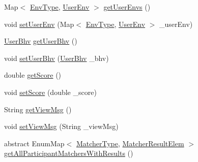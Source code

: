 \begin{DoxyCompactItemize}
\-Map$<$ \hyperlink{enumlab_1_1davidahn_1_1appshuttle_1_1collect_1_1env_1_1_env_type}{\-Env\-Type}, \hyperlink{classlab_1_1davidahn_1_1appshuttle_1_1collect_1_1env_1_1_user_env}{\-User\-Env} $>$ \hyperlink{classlab_1_1davidahn_1_1appshuttle_1_1predict_1_1matcher_1_1_matcher_result_elem_ad212c0c86a4040e391763f2ab1e55842}{get\-User\-Envs} ()
\item 
void \hyperlink{classlab_1_1davidahn_1_1appshuttle_1_1predict_1_1matcher_1_1_matcher_result_elem_af666120c1b741bb9b600a724f8a56019}{set\-User\-Env} (\-Map$<$ \hyperlink{enumlab_1_1davidahn_1_1appshuttle_1_1collect_1_1env_1_1_env_type}{\-Env\-Type}, \hyperlink{classlab_1_1davidahn_1_1appshuttle_1_1collect_1_1env_1_1_user_env}{\-User\-Env} $>$ \-\_\-user\-Env)
\item 
\hyperlink{interfacelab_1_1davidahn_1_1appshuttle_1_1collect_1_1bhv_1_1_user_bhv}{\-User\-Bhv} \hyperlink{classlab_1_1davidahn_1_1appshuttle_1_1predict_1_1matcher_1_1_matcher_result_elem_af24a7c62716f8a9c58ec2ad85a1f3b87}{get\-User\-Bhv} ()
\item 
void \hyperlink{classlab_1_1davidahn_1_1appshuttle_1_1predict_1_1matcher_1_1_matcher_result_elem_a2ac0822626db66597bbf58cb6d0252bf}{set\-User\-Bhv} (\hyperlink{interfacelab_1_1davidahn_1_1appshuttle_1_1collect_1_1bhv_1_1_user_bhv}{\-User\-Bhv} \-\_\-bhv)
\item 
double \hyperlink{classlab_1_1davidahn_1_1appshuttle_1_1predict_1_1matcher_1_1_matcher_result_elem_a07d9a358c1abad09e0e2a7fc712e968d}{get\-Score} ()
\item 
void \hyperlink{classlab_1_1davidahn_1_1appshuttle_1_1predict_1_1matcher_1_1_matcher_result_elem_ab6df94f56d43c77163293c0c369f1e58}{set\-Score} (double \-\_\-score)
\item 
\-String \hyperlink{classlab_1_1davidahn_1_1appshuttle_1_1predict_1_1matcher_1_1_matcher_result_elem_a6e7e3113a31533e5f7f3e79ee792ed70}{get\-View\-Msg} ()
\item 
void \hyperlink{classlab_1_1davidahn_1_1appshuttle_1_1predict_1_1matcher_1_1_matcher_result_elem_a69280cf2115178fb022e2cad487c4718}{set\-View\-Msg} (\-String \-\_\-view\-Msg)
\item 
abstract \-Enum\-Map$<$ \hyperlink{enumlab_1_1davidahn_1_1appshuttle_1_1predict_1_1matcher_1_1_matcher_type}{\-Matcher\-Type}, \*
\hyperlink{classlab_1_1davidahn_1_1appshuttle_1_1predict_1_1matcher_1_1_matcher_result_elem}{\-Matcher\-Result\-Elem} $>$ \hyperlink{classlab_1_1davidahn_1_1appshuttle_1_1predict_1_1matcher_1_1_matcher_result_elem_a9b5eec5912db470cfa5edfb95fe859ff}{get\-All\-Participant\-Matchers\-With\-Results} ()

\end{DoxyCompactItemize}
